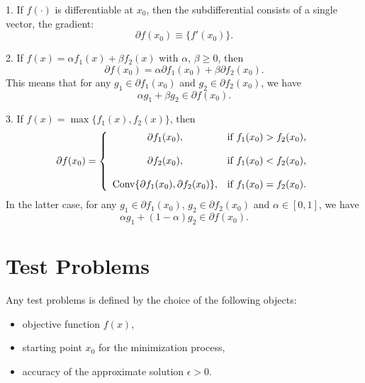 1. If $f(\cdot)$ is differentiable at $x_0$, then the
subdifferential consists of a single vector, the gradient:
$$
\partial f(x_0) \equiv \{ f'(x_0) \}.
$$

2. If $f(x) = \alpha f_1(x) + \beta f_2(x)$ with $\alpha$,
$\beta \geq 0$, then
$$
\partial f(x_0) = \alpha \partial f_1(x_0) + \beta \partial f_2(x_0).
$$
This means that for any $g_1 \in \partial f_1(x_0)$ and
$g_2 \in \partial f_2(x_0)$, we have
$$
\alpha g_1 + \beta g_2 \in \partial f(x_0).
$$

3. If $f(x) = \max \{ f_1(x), f_2(x) \}$, then
$$
\partial f(x_0) = \left\{
\ba{cl}
\partial f_1(x_0), & \mbox{if } f_1(x_0) > f_2(x_0),\\
\\
\partial f_2(x_0), & \mbox{if } f_1(x_0) < f_2(x_0),\\
\\
\mbox{Conv}\{ \partial f_1(x_0), \partial f_2(x_0) \}, &
\mbox{if } f_1(x_0) = f_2(x_0).
\ea
\right.
$$
In the latter case, for any $g_1 \in \partial f_1(x_0)$,
$g_2 \in \partial f_2(x_0)$ and $\alpha \in [0,1]$, we
have
$$
\alpha g_1 + (1 - \alpha) g_2 \in \partial f(x_0).
$$


\section{Test Problems}

Any test problems is defined by the choice of
the following objects:
\begin{itemize}
\item
objective function $f(x)$,
\item
starting point $x_0$ for the minimization process,
\item
accuracy of the approximate solution $\epsilon > 0$.
\end{itemize}

